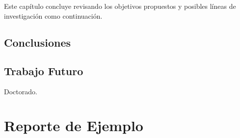 \documentclass[a4paper]{report}
\begin{document}
Este capítulo concluye revisando los objetivos propuestos y posibles líneas de investigación como continuación.

\section{Conclusiones}

\section{Trabajo Futuro}

Doctorado.



\appendix

\chapter{Reporte de Ejemplo}
\end{document}
